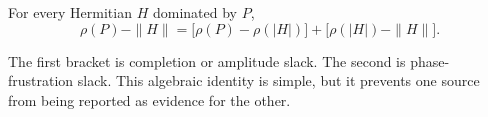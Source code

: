 \begin{corollary}\label{cor:split}
For every Hermitian \(H\) dominated by \(P\),
\begin{equation}\label{eq:split}
 \boxed{\displaystyle
 \rho(P)-\|H\|
 =
 \bigl[\rho(P)-\rho(|H|)\bigr]
 +
 \bigl[\rho(|H|)-\|H\|\bigr].}
\end{equation}
\end{corollary}

The first bracket is completion or amplitude slack.  The second is
phase-frustration slack.  This algebraic identity is simple, but it
prevents one source from being reported as evidence for the other.

